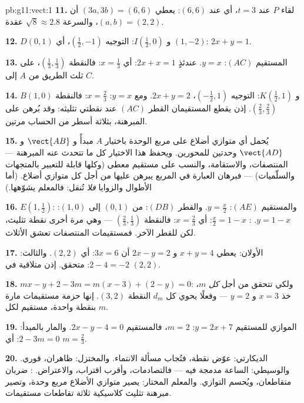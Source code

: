 \begin{solution}{pb:g11:vect:1}
\textbf{11.} لقاء $P$ عند $t = 3$، أي عند $(6, 6)$:
يعطي $(3a, 3b) = (6, 6)$ أن $(a, b) = (2, 2)$، والسرعة
$\sqrt{8} \approx 2.8$ عقدة.

\textbf{12.} $D(0, 1)$ و $I\left(\frac12, 0\right)$: التوجيه
$\left(\frac12, -1\right)$، أي $(1, -2)$: 
$2x + y = 1$.

\textbf{13.} المستقيم $(AC)$: $y = x$. عندئذٍ $2x + x = 1$:
أي $x = \frac13$: فالنقطة $\left(\frac13, \frac13\right)$، على
ثلث الطريق من $A$ إلى $C$.

\textbf{14.} $B(1, 0)$ و $K\left(\frac12, 1\right)$: التوجيه
$\left(-\frac12, 1\right)$،  $2x + y = 2$. ومع
$y = x$: $x = \frac23$: فالنقطة
$\left(\frac23, \frac23\right)$. إذن يقطع المستقيمان القطر $(AC)$ عند
نقطتي تثليثه: وقد بُرهن على المبرهنة، بثلاثة أسطر من الحساب مرتين.

\textbf{15.} يُحمل أي متوازي أضلاع على مربع الوحدة
باختيار $A$ مبدأً و $\vect{AB}$ و $\vect{AD}$ وحدتين
للمحورين. ويحفظ هذا الاختيار كل ما تتحدث عنه المبرهنة
--- المنتصفات، والاستقامة، والنسب على مستقيم معطى (وكلها
قابلة للتعبير بالمتجهات والسلّميات) --- فبرهان
العبارة في المربع يبرهن عليها من أجل كل متوازي أضلاع.
(أما الأطوال والزوايا \emph{فلا} تُنقل: فالمعلم يشوّهها.)

\textbf{16.} $E\left(1, \frac12\right)$: والمستقيم $(AE)$:
$y = \frac x2$. والقطر $(DB)$: من $(0,1)$ إلى $(1,0)$:
$y = 1 - x$. : $\frac x2 = 1 - x$: أي $x = \frac23$:
فالنقطة $\left(\frac23, \frac13\right)$ --- وهي مرة أخرى
نقطة تثليث، لكن للقطر الآخر. فمستقيمات المنتصفات
تعشق الأثلاث.

\textbf{17.} الأولان: يعطي $x + y = 4$ و $2x - y = 2$ أن
$3x = 6$: أي $(2, 2)$. والثالث: $2 - 4 = -2$: متحقق. إذن متلاقية
في $(2, 2)$.

\textbf{18.} $mx - y + 2 - 3m = m(x - 3) + (2 - y) = 0$: ولكي
تتحقق  من أجل \emph{كل} $m$، خذ $x = 3$ و
$y = 2$ --- وفعلًا يحوي كل $d_m$ النقطة $(3, 2)$. إنها حزمة
مستقيمات مارة بنقطة واحدة، مستقيم لكل  $m$.

\textbf{19.} الموازي للمستقيم $y = 2x + 7$:  $m = 2$، فالمستقيم
$2x - y - 4 = 0$. والمار بالمبدأ: $2 - 3m = 0$:
أي $m = \frac23$.

\textbf{20.} الديكارتي: عوّض نقطة، فتُجاب مسألة الانتماء.
والمختزل:   ظاهران،  فوري.
والوسيطي: الساعة مدمجة فيه --- فالتصادمات، وأقرب
اقتراب، والاعتراض. : ضربان
متقاطعان، ويُحسم التوازي. والمعلم المختار: يصير
متوازي الأضلاع مربع وحدة، وتصير مبرهنة تثليث
كلاسيكية ثلاثة تقاطعات مستقيمات.
\end{solution}
